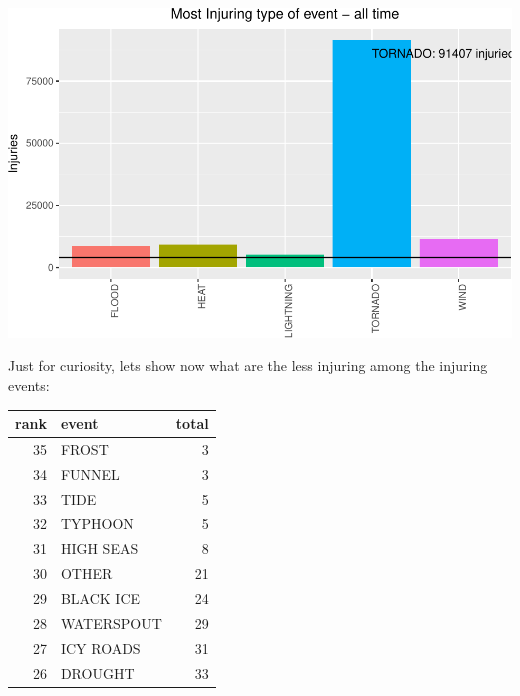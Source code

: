 \documentclass[]{article}
\newenvironment{Shaded}{\begin{snugshade}}{\end{snugshade}}
\newcommand{\KeywordTok}[1]{\textcolor[rgb]{0.13,0.29,0.53}{\textbf{{#1}}}}
\newcommand{\DataTypeTok}[1]{\textcolor[rgb]{0.13,0.29,0.53}{{#1}}}
\newcommand{\DecValTok}[1]{\textcolor[rgb]{0.00,0.00,0.81}{{#1}}}
\newcommand{\StringTok}[1]{\textcolor[rgb]{0.31,0.60,0.02}{{#1}}}
\newcommand{\CommentTok}[1]{\textcolor[rgb]{0.56,0.35,0.01}{\textit{{#1}}}}
\newcommand{\NormalTok}[1]{{#1}}
\begin{document}
\includegraphics{readme_files/figure-latex/injuring-all-plot-1.pdf}

Just for curiosity, lets show now what are the less injuring among the
injuring events:

\begin{Shaded}
\end{Shaded}

\begin{longtable}[]{@{}rlr@{}}
\toprule
rank & event & total\tabularnewline
\midrule
\endhead
35 & FROST & 3\tabularnewline
34 & FUNNEL & 3\tabularnewline
33 & TIDE & 5\tabularnewline
32 & TYPHOON & 5\tabularnewline
31 & HIGH SEAS & 8\tabularnewline
30 & OTHER & 21\tabularnewline
29 & BLACK ICE & 24\tabularnewline
28 & WATERSPOUT & 29\tabularnewline
27 & ICY ROADS & 31\tabularnewline
26 & DROUGHT & 33\tabularnewline
\bottomrule
\end{longtable}
\end{document}
